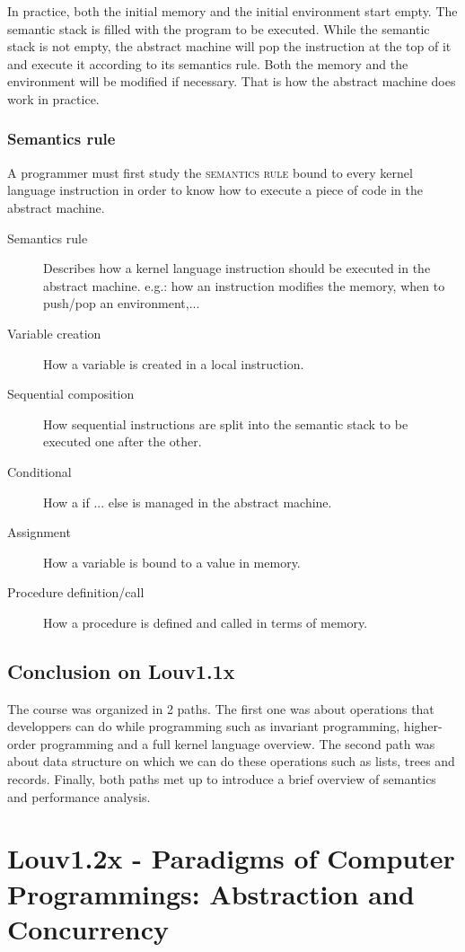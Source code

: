 \documentclass[11pt,a4paper,twoside,openright]{report}
\begin{document}
In practice, both the initial memory and the initial environment start empty. 
The semantic stack is filled with the program to be executed. While the 
semantic 
stack is not empty, the abstract machine will pop the instruction at the top of 
it and execute it according to its semantics rule. Both the memory and the 
environment will be modified if necessary. That is how the abstract machine 
does 
work in practice. 

\subsection{Semantics rule}

A programmer must first study the \textsc{semantics rule} bound to every kernel 
language instruction in order to know how to execute a piece of code in the 
abstract machine.
\begin{description}
 \item[Semantics rule] Describes how a kernel language instruction should be 
executed in the abstract machine. e.g.: how an instruction modifies the 
memory, when to push/pop an environment,...
	\item[Variable creation] How a variable is created in a local 
instruction.
	\item[Sequential composition] How sequential instructions are split 
into the semantic stack to be executed one after the other.
	\item[Conditional] How a if ... else is managed in the abstract machine.
	\item[Assignment] How a variable is bound to a value in memory.
	\item[Procedure definition/call] How a procedure is defined and called 
in terms of memory.
\end{description}

\section{Conclusion on Louv1.1x}
The course was organized in 2 paths. The first one was about operations that 
developpers can do while programming such as invariant programming, 
higher-order 
programming and a full kernel language overview. The second path was about data 
structure on which we can do these operations such as lists, trees and records. 
Finally, both paths met up to introduce a brief overview of semantics and 
performance analysis.

\chapter{Louv1.2x - Paradigms of Computer Programmings: Abstraction and 
Concurrency}
\end{document}
